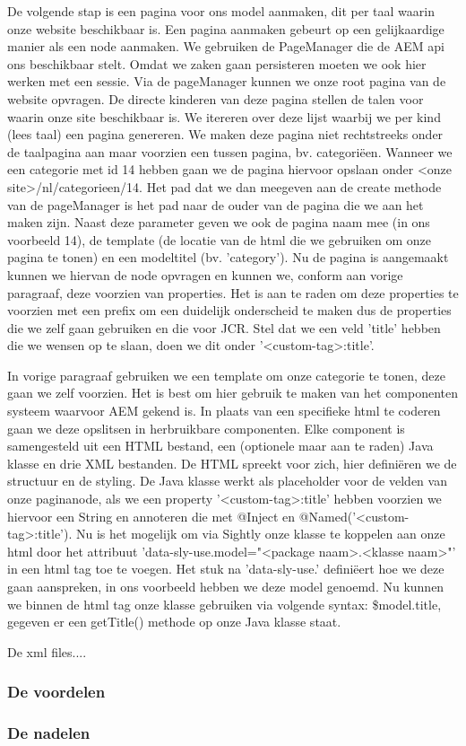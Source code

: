 \documentclass{article}
\begin{document}
	De volgende stap is een pagina voor ons model aanmaken, dit per taal waarin onze website beschikbaar is. Een pagina aanmaken gebeurt op een gelijkaardige manier als een node aanmaken. We gebruiken de PageManager die de AEM api ons beschikbaar stelt. Omdat we zaken gaan persisteren moeten we ook hier werken met een sessie. Via de pageManager kunnen we onze root pagina van de website opvragen. De directe kinderen van deze pagina stellen de talen voor waarin onze site beschikbaar is. We itereren over deze lijst waarbij we per kind (lees taal) een pagina genereren. We maken deze pagina niet rechtstreeks onder de taalpagina aan maar voorzien een tussen pagina, bv. categoriëen. Wanneer we een categorie met id 14 hebben gaan we de pagina hiervoor opslaan onder <onze site>/nl/categorieen/14. Het pad dat we dan meegeven aan de create methode van de pageManager is het pad naar de ouder van de pagina die we aan het maken zijn. Naast deze parameter geven we ook de pagina naam mee (in ons voorbeeld 14), de template (de locatie van de html die we gebruiken om onze pagina te tonen) en een modeltitel (bv. 'category'). Nu de pagina is aangemaakt kunnen we hiervan de node opvragen en kunnen we, conform aan vorige paragraaf, deze voorzien van properties. Het is aan te raden om deze properties te voorzien met een prefix om een duidelijk onderscheid te maken dus de properties die we zelf gaan gebruiken en die voor JCR. Stel dat we een veld 'title' hebben die we wensen op te slaan, doen we dit onder '<custom-tag>:title'.
    \par
    In vorige paragraaf gebruiken we een template om onze categorie te tonen, deze gaan we zelf voorzien. Het is best om hier gebruik te maken van het componenten systeem waarvoor AEM gekend is. In plaats van een specifieke html te coderen gaan we deze opslitsen in herbruikbare componenten. Elke component is samengesteld uit een HTML bestand, een (optionele maar aan te raden) Java klasse en drie XML bestanden. De HTML spreekt voor zich, hier definiëren we de structuur en de styling. De Java klasse werkt als placeholder voor de velden van onze paginanode, als we een property '<custom-tag>:title' hebben voorzien we hiervoor een String en annoteren die met @Inject en @Named('<custom-tag>:title'). Nu is het mogelijk om via Sightly onze klasse te koppelen aan onze html door het attribuut 'data-sly-use.model="<package naam>.<klasse naam>"' in een html tag toe te voegen. Het stuk na 'data-sly-use.' definiëert hoe we deze gaan aanspreken, in ons voorbeeld hebben we deze model genoemd. Nu kunnen we binnen de html tag onze klasse gebruiken via volgende syntax: \${model.title}, gegeven er een getTitle() methode op onze Java klasse staat.
    \par
    De xml files....
	\subsubsection{De voordelen}
    
	\subsubsection{De nadelen}
\end{document}
